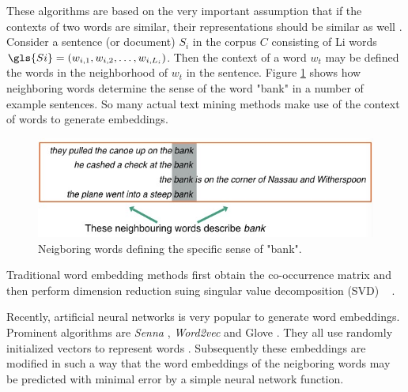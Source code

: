 These algorithms are based on the very important assumption that if the contexts of two words are similar, their representations should be similar as well \citep{Harris1954}.
Consider a sentence (or document) $S_i$ in the corpus $C$ consisting of \gls{Li} %
words $\gls{Si} = (w_{i,1},w_{i,2},\ldots,w_{i,L_i})$. %
Then the context  of a word $w_t$ may be defined the words in the neighborhood of $w_t$ in the sentence.
Figure \ref{fig:neighbouring_words} shows how neighboring words determine the sense of the word "bank" in a number of example sentences. So many actual text mining methods make use of the context of words to generate embeddings. 
\begin{figure}[H]
\centering
\begin{minipage}{1.0\textwidth}
 
	\includegraphics[width=1.0\textwidth]{neighbouring_words} 
	
\end{minipage}%
\label{fig:neighbouring_words}
\caption{Neigboring words defining the specific sense of "bank".}
\end{figure}	

Traditional word embedding methods first obtain the co-occurrence matrix and then perform dimension reduction suing singular value decomposition (SVD) ~ \citep{DeerwesterDumaisEtAl1990}. 

Recently, artificial neural networks is very popular to generate word embeddings. Prominent algorithms are \emph{Senna} \citep{CollobertWeston2008}, \emph{Word2vec} \citep{MikolovSutskeverEtAl2013} and Glove \citep{PenningtonSocherEtAl2014}. They all use randomly initialized vectors to represent words . Subsequently these embeddings are modified in such a way that the word embeddings of the neigboring words may be predicted with minimal error by a simple neural network function. 


